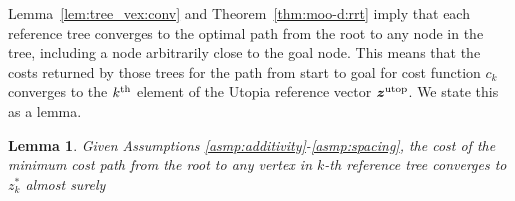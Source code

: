 \documentclass{article}
\newtheorem{lem}{Lemma}
\begin{document}

Lemma~\ref{lem:tree_vex:conv} and Theorem~\ref{thm:moo-d:rrt} imply that each reference tree converges to the optimal path from the root to any node in the tree, including a node arbitrarily close to the goal node.  This means that the costs returned by those trees for the path from start to goal for cost function $c_k$ converges to the $k^{\rm th}$ element of the Utopia reference vector $ \bm{z}^{\rm utop} $.  We state this as a lemma.
\begin{lem}
\label{lem:ref_tree:conv}
Given Assumptions \ref{asmp:additivity}-\ref{asmp:spacing},
the cost of the minimum cost path from the root to any vertex in $ k $-th reference tree converges to $ z^{*}_{k} $ almost surely%
\end{lem}
\end{document}
